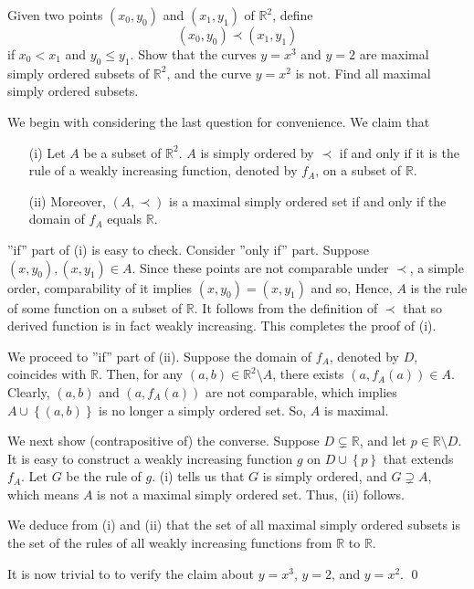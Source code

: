 \documentclass[a4paper,12pt]{article}
\begin{document}
\begin{exe}
	Given two points \( (x_0,y_0) \) and \( (x_1,y_1) \) of \( \mathbb{R}^2 \),
	define
	\begin{equation*}
		(x_0,y_0) \prec (x_1,y_1) 
	\end{equation*}
	if \( x_0 < x_1 \) and \( y_0 \le y_1 \).
	Show that the curves \( y=x^3 \) and \( y=2 \) are maximal simply ordered subsets of \( \mathbb{R}^2 \),
	and the curve \( y=x^2 \) is not.
	Find all maximal simply ordered subsets.
\end{exe}
\begin{sol}
	We begin with considering the last question for convenience.
	We claim that
	\begin{enumerate}
		\item[(i)]
		      Let \( A \) be a subset of \( \mathbb{R}^2 \).
		      \( A \) is simply ordered by \( \prec \)
		      if and only if it is the rule of a weakly increasing function, denoted by \( f_A \), on a subset of \( \mathbb{R} \).
		      
		\item[(ii)]
		      Moreover,
		      \( (A,\prec) \) is a maximal simply ordered set if and only if the domain of \( f_A \) equals \( \mathbb{R} \).
	\end{enumerate}
	''if'' part of (i) is easy to check.
	Consider ''only if'' part.
	Suppose \( (x,y_0),(x,y_1) \in A \).
	Since these points are not comparable under \( \prec \), a simple order,
	comparability of it implies
	\( (x,y_0)=(x,y_1) \)
	and so,
	Hence, \( A \) is the rule of some function on a subset of \( \mathbb{R} \).
	It follows from the definition of \( \prec \) that
	so derived function is in fact weakly increasing.
	This completes the proof of (i).
	
	We proceed to ''if'' part of (ii).
	Suppose the domain of \( f_A \), denoted by \( D \),
	coincides with \( \mathbb{R} \).
	Then, for any \( (a,b)\in \mathbb{R}^2 \setminus A \),
	there exists \( (a,f_A(a))\in A \).
	Clearly, \( (a,b) \) and \( (a,f_A(a)) \) are not comparable,
	which implies \( A \cup \left\{ (a,b) \right\} \) is no longer a simply ordered set.
	So, \( A \) is maximal.
	
	We next show (contrapositive of) the converse.
	Suppose \( D \subsetneq \mathbb{R} \),
	and let \(  p \in \mathbb{R} \setminus D \).
	It is easy to construct a weakly increasing function \( g \) on \( D \cup \left\{ p \right\} \)
	that extends \( f_A \).
	Let \( G \) be the rule of \( g \).
	(i) tells us that \( G \) is simply ordered, and \( G \supsetneq A \),
	which means \( A \) is not a maximal simply ordered set.
	Thus, (ii) follows.
	
	We deduce from (i) and (ii) that the set of all maximal simply ordered subsets is the set of the rules of all weakly increasing functions from \( \mathbb{R} \) to \( \mathbb{R} \).
	
	It is now trivial to to verify the claim about \( y=x^3 \), \( y=2 \),
	and \( y=x^2 \).
	\qed\end{sol}
\end{document}
